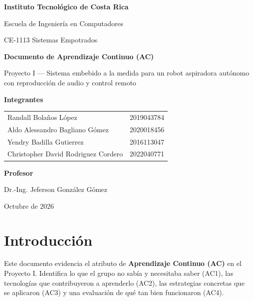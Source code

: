 \documentclass[11pt,a4paper]{article}
\begin{document}
\begin{titlepage}
\centering
{\large\bfseries Instituto Tecnológico de Costa Rica\par}
\vspace{0.3cm}
{\large Escuela de Ingeniería en Computadores\par}
\vspace{0.3cm}
{\large CE-1113 Sistemas Empotrados\par}
\vspace{3.2cm}
{\LARGE\bfseries Documento de Aprendizaje Continuo (AC)\par}
\vspace{0.6cm}
{\Large Proyecto I --- Sistema embebido a la medida para un robot aspiradora
autónomo con reproducción de audio y control remoto\par}
\vspace{3.2cm}
{\large\bfseries Integrantes\par}
\vspace{0.2cm}
{\large
\begin{tabular}{ll}
Randall Bolaños López & 2019043784 \\
Aldo Alessandro Bagliano Gómez & 2020018456 \\
Yendry Badilla Gutierrez & 2016113047 \\
Christopher David Rodriguez Cordero & 2022040771 \\
\end{tabular}\par}
\vspace{1.6cm}
{\large\bfseries Profesor\par}
\vspace{0.2cm}
{\large Dr.-Ing. Jeferson González Gómez\par}
\vfill
{\large Octubre de 2026\par}
\end{titlepage}

\tableofcontents
\newpage

\section{Introducción}

Este documento evidencia el atributo de \textbf{Aprendizaje Continuo (AC)} en
el Proyecto I. Identifica lo que el grupo no sabía y necesitaba saber (AC1),
las tecnologías que contribuyeron a aprenderlo (AC2), las estrategias
concretas que se aplicaron (AC3) y una evaluación de qué tan bien funcionaron
(AC4).
\end{document}
